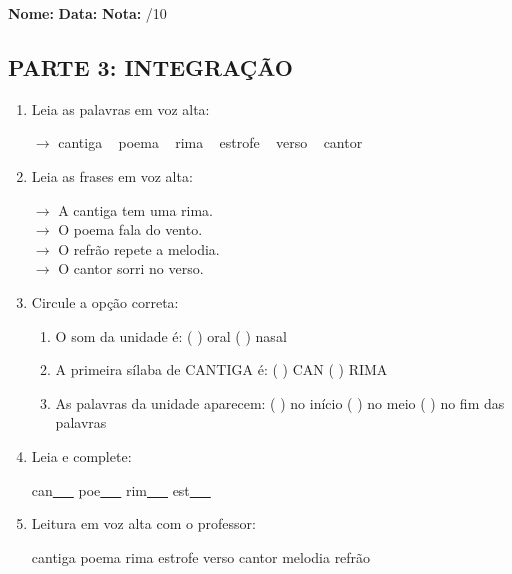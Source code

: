 \begin{exercicio}

\noindent\textbf{Nome:} \underline{\hspace{3.2cm}} \quad \textbf{Data:} \underline{\hspace{1.6cm}} \quad \textbf{Nota:} \underline{\hspace{0.9cm}}/10


\subsection*{PARTE 3: INTEGRAÇÃO}

\begin{enumerate}[resume]

  \item Leia as palavras em voz alta:
  \begin{center}
  $\rightarrow$ cantiga ~ poema ~ rima ~ estrofe ~ verso ~ cantor
  \end{center}

  \item Leia as frases em voz alta:
  \begin{center}
  $\rightarrow$ A cantiga tem uma rima.\\
  $\rightarrow$ O poema fala do vento.\\
  $\rightarrow$ O refrão repete a melodia.\\
  $\rightarrow$ O cantor sorri no verso.\\
  \end{center}

  \item Circule a opção correta:
  \begin{enumerate}[label=(\alph*)]

    \item O som da unidade é: ( ) oral ( ) nasal 

    \item A primeira sílaba de CANTIGA é: ( ) CAN ( ) RIMA

    \item As palavras da unidade aparecem: ( ) no início ( ) no meio ( ) no fim das palavras

  \end{enumerate}

  \item Leia e complete:
  \begin{center}
  can\underline{~~~} \quad poe\underline{~~~} \quad rim\underline{~~~} \quad est\underline{~~~}
  \end{center}

  \item Leitura em voz alta com o professor:
  \begin{center}
  cantiga \quad poema \quad rima \quad estrofe \quad verso \quad cantor \quad melodia \quad refrão
  \end{center}

\end{enumerate}

\end{exercicio}

